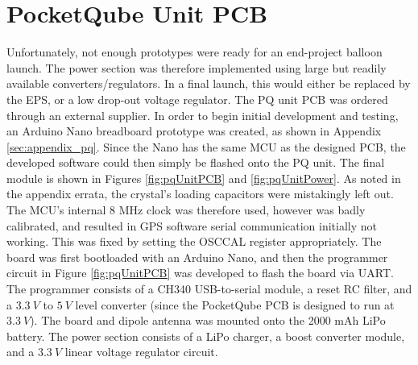 \graphicspath{{./figures}}

\section{PocketQube Unit PCB}
Unfortunately, not enough prototypes were ready for an end-project balloon launch. The power section was therefore implemented using large but readily available converters/regulators. In a final launch, this would either be replaced by the EPS, or a low drop-out voltage regulator. The PQ unit PCB was ordered through an external supplier. In order to begin initial development and testing, an Arduino Nano breadboard prototype was created, as shown in Appendix \ref{sec:appendix_pq}. Since the Nano has the same MCU as the designed PCB, the developed software could then simply be flashed onto the PQ unit. The final module is shown in Figures \ref{fig:pqUnitPCB} and \ref{fig:pqUnitPower}. As noted in the appendix errata, the crystal's loading capacitors were mistakingly left out. The MCU's internal 8 MHz clock was therefore used, however was badly calibrated, and resulted in GPS software serial communication initially not working. This was fixed by setting the OSCCAL register appropriately. The board was first bootloaded with an Arduino Nano, and then the programmer circuit in Figure \ref{fig:pqUnitPCB} was developed to flash the board via UART. The programmer consists of a CH340 USB-to-serial module, a reset RC filter, and a $\SI{3.3}{V}$ to $\SI{5}{V}$ level converter (since the PocketQube PCB is designed to run at $\SI{3.3}{V}$). The board and dipole antenna was mounted onto the 2000 mAh LiPo battery. The power section consists of a LiPo charger, a boost converter module, and a $\SI{3.3}{V}$ linear voltage regulator circuit.
